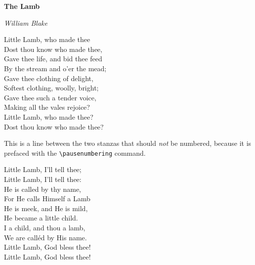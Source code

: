\documentclass{memoir}
\begin{document}
\textbf{The Lamb}

\emph{William Blake}

\begingroup
    \beginnumbering \autopar

Little Lamb, who made thee\\
Dost thou know who made thee,\\
Gave thee life, and bid thee feed\\
By the stream and o'er the mead;\\
Gave thee clothing of delight,\\
Softest clothing, woolly, bright;\\
Gave thee such a tender voice,\\
Making all the vales rejoice?\\
Little Lamb, who made thee?\\
Dost thou know who made thee?

\pausenumbering

This is a line between the two stanzas that should \emph{not} be numbered, because it is prefaced with the \verb|\pausenumbering| command.

\resumenumbering

Little Lamb, I'll tell thee;\\
Little Lamb, I'll tell thee:\\
He is called by thy name,\\
For He calls Himself a Lamb\\
He is meek, and He is mild,\\
He became a little child.\\
I a child, and thou a lamb,\\
We are call\'ed by His name.\\
Little Lamb, God bless thee!\\
Little Lamb, God bless thee!

    \endnumbering
\endgroup

\printindex
\end{document}
